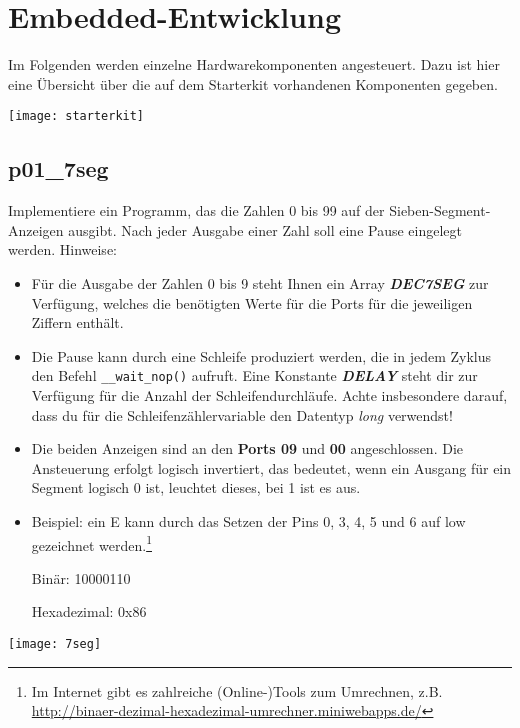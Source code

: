 \section{Embedded-Entwicklung}

Im Folgenden werden einzelne Hardwarekomponenten angesteuert. Dazu ist hier eine Übersicht über die auf dem Starterkit vorhandenen Komponenten gegeben.
\begin{center}\texttt{[image: starterkit]}\end{center}

\subsection{p01\_7seg}
\label{exercise7Segment}

Implementiere ein Programm, das die Zahlen 0 bis 99 auf der Sieben-Segment-Anzeigen ausgibt.
Nach jeder Ausgabe einer Zahl soll eine Pause eingelegt werden.
Hinweise:\begin{itemize}
\item 
Für die Ausgabe der Zahlen 0 bis 9 steht Ihnen ein Array \textbf{\emph{DEC7SEG}} zur Verfügung, welches die benötigten Werte für die Ports für die jeweiligen Ziffern enthält.

\item 
Die Pause kann durch eine Schleife produziert werden, die in jedem Zyklus den Befehl \texttt{\_\_wait\_nop()} aufruft.
Eine Konstante \textbf{\emph{DELAY}} steht dir zur Verfügung für die Anzahl der Schleifendurchläufe.
Achte insbesondere darauf, dass du für die Schleifenzählervariable den Datentyp \emph{long} verwendst!

\item
Die beiden Anzeigen sind an den \textbf{Ports 09} und \textbf{00} angeschlossen.
Die Ansteuerung erfolgt logisch invertiert, das bedeutet, wenn ein Ausgang für ein Segment logisch 0 ist, leuchtet dieses, bei 1 ist es aus.

\item
Beispiel: ein \glqq{}E\grqq{} kann durch das Setzen der Pins 0, 3, 4, 5 und 6 auf low gezeichnet werden.\footnote{
	Im Internet gibt es zahlreiche (Online-)Tools zum Umrechnen, z.B. 
	\url{http://binaer-dezimal-hexadezimal-umrechner.miniwebapps.de/}
}

\quad Binär: 10000110

\quad Hexadezimal: 0x86
\end{itemize}
\begin{center}\texttt{[image: 7seg]}\end{center}

